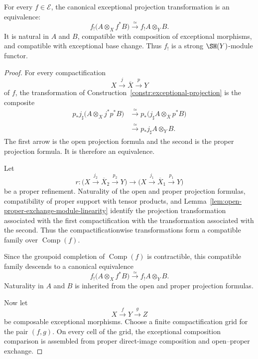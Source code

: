 \begin{theorem}
\label{thm:exceptional-projection-formula}
For every \(f\in\mathcal E\), the canonical exceptional projection
transformation is an equivalence:
\[
    f_!
    \bigl(
      A\otimes_Xf^*B
    \bigr)
    \xrightarrow{\simeq}
    f_!A\otimes_YB.
\]
It is natural in \(A\) and \(B\), compatible with composition of
exceptional morphisms, and compatible with exceptional base change.
Thus \(f_!\) is a strong \(\SH(Y)\)-module functor.
\end{theorem}

\begin{proof}
For every compactification
\[
    X\xrightarrow{j}\overline X\xrightarrow{p}Y
\]
of \(f\), the transformation of
Construction~\ref{constr:exceptional-projection}
is the composite
\[
\begin{aligned}
    p_*j_\sharp
    \bigl(
      A\otimes_Xj^*p^*B
    \bigr)
    &\xrightarrow{\simeq}
    p_*
    \bigl(
      j_\sharp A\otimes_{\overline X}p^*B
    \bigr) \\
    &\xrightarrow{\simeq}
    p_*j_\sharp A\otimes_YB.
\end{aligned}
\]
The first arrow is the open projection formula and the second is the proper
projection formula.  It is therefore an equivalence.

Let
\[
    r:
    \bigl(
      X\xrightarrow{j_2}\overline X_2\xrightarrow{p_2}Y
    \bigr)
    \longrightarrow
    \bigl(
      X\xrightarrow{j_1}\overline X_1\xrightarrow{p_1}Y
    \bigr)
\]
be a proper refinement.  Naturality of the open and proper projection
formulas, compatibility of proper support with tensor products, and
Lemma~\ref{lem:open-proper-exchange-module-linearity}
identify the projection transformation associated with the first
compactification with the transformation associated with the second.
Thus the compactificationwise transformations form a compatible family over
\(\operatorname{Comp}(f)\).

Since the groupoid completion of \(\operatorname{Comp}(f)\) is
contractible, this compatible family descends to a canonical equivalence
\[
    f_!
    \bigl(
      A\otimes_Xf^*B
    \bigr)
    \xrightarrow{\simeq}
    f_!A\otimes_YB.
\]
Naturality in \(A\) and \(B\) is inherited from the open and proper
projection formulas.

Now let
\[
    X\xrightarrow{f}Y\xrightarrow{g}Z
\]
be composable exceptional morphisms.  Choose a finite compactification grid
for the pair \((f,g)\).  On every cell of the grid, the exceptional
composition comparison is assembled from proper direct-image composition
and open--proper exchange.


\end{proof}
